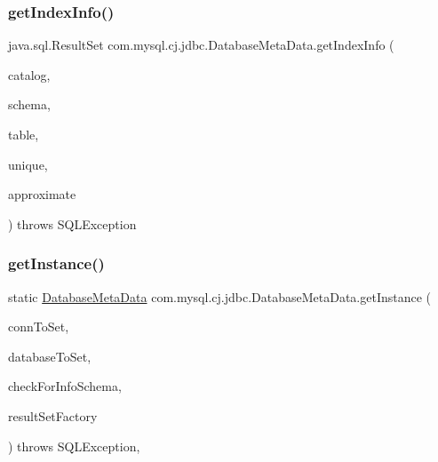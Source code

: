 \subsubsection{\texorpdfstring{get\+Index\+Info()}{getIndexInfo()}}
{\footnotesize\ttfamily java.\+sql.\+Result\+Set com.\+mysql.\+cj.\+jdbc.\+Database\+Meta\+Data.\+get\+Index\+Info (\begin{DoxyParamCaption}\item[{String}]{catalog,  }\item[{String}]{schema,  }\item[{final String}]{table,  }\item[{final boolean}]{unique,  }\item[{boolean}]{approximate }\end{DoxyParamCaption}) throws S\+Q\+L\+Exception}

\mbox{\label{classcom_1_1mysql_1_1cj_1_1jdbc_1_1_database_meta_data_a599d79d54f0f2dcee19845af18403094}} 
\subsubsection{\texorpdfstring{get\+Instance()}{getInstance()}}
{\footnotesize\ttfamily static \mbox{\hyperlink{classcom_1_1mysql_1_1cj_1_1jdbc_1_1_database_meta_data}{Database\+Meta\+Data}} com.\+mysql.\+cj.\+jdbc.\+Database\+Meta\+Data.\+get\+Instance (\begin{DoxyParamCaption}\item[{\mbox{\hyperlink{interfacecom_1_1mysql_1_1cj_1_1jdbc_1_1_jdbc_connection}{Jdbc\+Connection}}}]{conn\+To\+Set,  }\item[{String}]{database\+To\+Set,  }\item[{boolean}]{check\+For\+Info\+Schema,  }\item[{\mbox{\hyperlink{classcom_1_1mysql_1_1cj_1_1jdbc_1_1result_1_1_result_set_factory}{Result\+Set\+Factory}}}]{result\+Set\+Factory }\end{DoxyParamCaption}) throws S\+Q\+L\+Exception\hspace{0.3cm}{\ttfamily [static]}, {\ttfamily [protected]}}

\mbox{\label{classcom_1_1mysql_1_1cj_1_1jdbc_1_1_database_meta_data_acf7ab48f588b46a8b2c8ea7c4dee7aa1}} 
